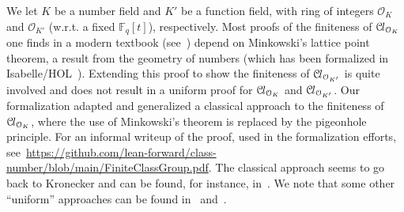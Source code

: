 \documentclass[a4paper,USenglish,cleveref, autoref, thm-restate]{lipics-v2021}
\newcommand*{\OK}[1][K]{\mathcal{O}_{#1}}
\newcommand*{\Cl}{\mathcal{C}\kern-.075em l}
\newcommand*{\Fq}[1][q]{\mathbb{F}_{#1}}
\newcommand{\mathlib}{\textsf{mathlib}\xspace}
\begin{document}
We let $K$ be a number field and $K'$ be a function field, with ring of integers $\OK$ and $\OK[K']$ (w.r.t. a fixed $\Fq[q][t]$), respectively. 
Most proofs of the finiteness of $\Cl_{\OK}$ one finds in a modern textbook (see~\cite[Theorems 4.4,~5.3,~6.3]{Neukirch}) depend on Minkowski's lattice point theorem, a result from the geometry of numbers (which has been formalized in Isabelle/HOL~\cite{Minkowskis_Theorem-AFP}).
Extending this proof to show the finiteness of $\Cl_{\OK[K']}$ is quite involved and does not result in a uniform proof for $\Cl_{\OK}$ and $\Cl_{\OK[K']}$.
Our formalization adapted and generalized a classical approach to the finiteness of $\Cl_{\OK}$, where the use of Minkowski's theorem is replaced by the pigeonhole principle. 
For an informal writeup of the proof, used in the formalization efforts, see~\url{https://github.com/lean-forward/class-number/blob/main/FiniteClassGroup.pdf}.
The classical approach seems to go back to Kronecker
and can be found, for instance, in~\cite{Ireland-Rosen}.
We note that some other ``uniform'' approaches can be found in~\cite{Artin-Whaples} and~\cite{Stasinski}.
\end{document}
